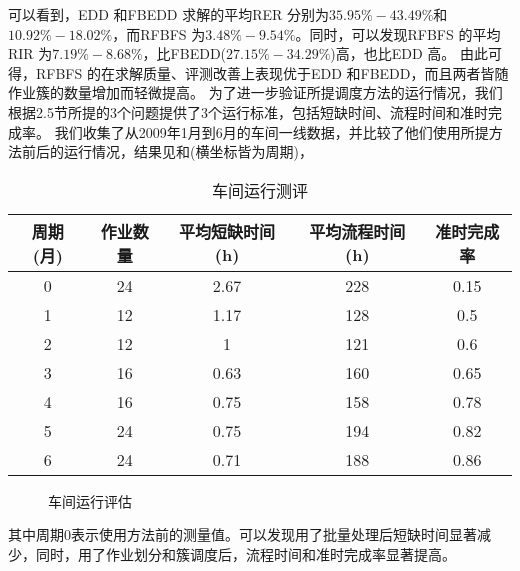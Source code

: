 可以看到，EDD 和FBEDD 求解的平均RER 分别为$35.95\% - 43.49\%$和$10.92\% - 18.02\%$，而RFBFS 为$3.48\% - 9.54\%$。同时，可以发现RFBFS 的平均RIR 为$7.19\% - 8.68\%$，比FBEDD($27.15\% - 34.29\%$)高，也比EDD 高。
由此可得，RFBFS 的在求解质量、评测改善上表现优于EDD 和FBEDD，而且两者皆随作业簇的数量增加而轻微提高。
为了进一步验证所提调度方法的运行情况，我们根据2.5节所提的3个问题提供了3个运行标准，包括短缺时间、流程时间和准时完成率。
我们收集了从2009年1月到6月的车间一线数据，并比较了他们使用所提方法前后的运行情况，结果见和(横坐标皆为周期)，
\begin{table}[h]
  \centering\xiaowu
  \caption{车间运行测评\label{tab:performancemeasure}}
    \begin{tabular}{ccccc}
    \toprule
    周期 (月) & 作业数量  & 平均短缺时间 (h) & 平均流程时间 (h) & 准时完成率 \\
    \midrule
    0     & 24    & 2.67  & 228   & 0.15 \\
    1     & 12    & 1.17  & 128   & 0.5 \\
    2     & 12    & 1     & 121   & 0.6 \\
    3     & 16    & 0.63  & 160   & 0.65 \\
    4     & 16    & 0.75  & 158   & 0.78 \\
    5     & 24    & 0.75  & 194   & 0.82 \\
    6     & 24    & 0.71  & 188   & 0.86 \\
    \bottomrule
    \end{tabular}
\end{table}\vspace{-0.8cm}
\begin{figure}[h]
\begin{floatrow}
  \caption{车间运行评估\label{fig:performancemeasures}}
  \end{floatrow}
\end{figure}
其中周期0表示使用方法前的测量值。可以发现用了批量处理后短缺时间显著减少，同时，用了作业划分和簇调度后，流程时间和准时完成率显著提高。
